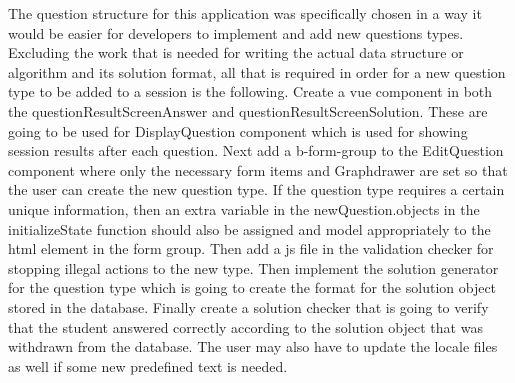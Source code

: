 The question structure for this application was specifically chosen in a way it would be easier for developers to implement and add new questions types. Excluding the work that is needed for writing the actual data structure or algorithm and its solution format, all that is required in order for a new question type to be added to a session is the following. Create a vue component in both the questionResultScreenAnswer and questionResultScreenSolution. These are going to be used for DisplayQuestion component which is used for showing session results after each question. Next add a b-form-group to the EditQuestion component where only the necessary form items and Graphdrawer are set so that the user can create the new question type. If the question type requires a certain unique information, then an extra variable in the newQuestion.objects in the initializeState function should also be assigned and model appropriately to the html element in the form group. Then add a js file in the validation checker for stopping illegal actions to the new type. Then implement the solution generator for the question type which is going to create the format for the solution object stored in the database. Finally create a solution checker that is going to verify that the student answered correctly according to the solution object that was withdrawn from the database. The user may also have to update the locale files as well if some new predefined text is needed.\\[11pt]

 